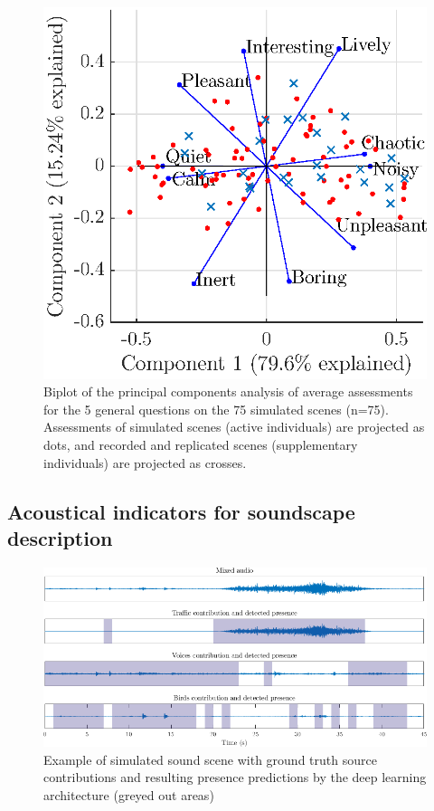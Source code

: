 \documentclass[twocolumn]{article}
\begin{document}
\begin{figure}[h]
    \centering
    \includegraphics[width=0.8\columnwidth]{figures/pca_sim.eps}
    \caption{Biplot of the principal components analysis of average assessments for the 5 general questions on the 75 simulated scenes (n=75). Assessments of simulated scenes (active individuals) are projected as dots, and recorded and replicated scenes (supplementary individuals) are projected as crosses.}\label{fig:pspace_sim}
\end{figure}


\subsection{Acoustical indicators for soundscape description}
\label{sec:data_inds}

\begin{figure}[t!]
    \centering
    \includegraphics[width=1.5\columnwidth]{figures/pred_ex.png}
    \caption{Example of simulated sound scene with ground truth source contributions and resulting presence predictions by the deep learning architecture (greyed out areas)}\label{fig:pred_ex}
\end{figure}
\end{document}
